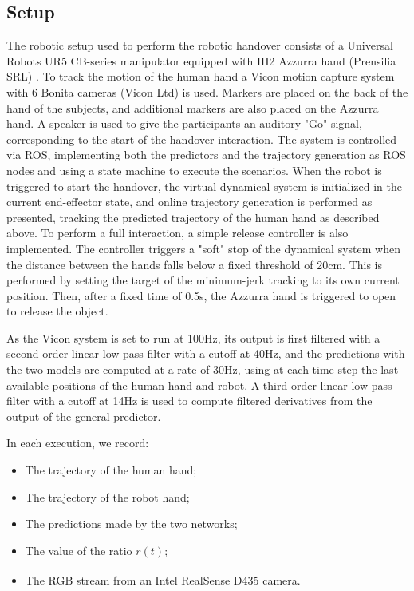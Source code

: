 \documentclass[lettersize,journal]{IEEEtran}
\begin{document}

\subsection{Setup}

\noindent
The robotic setup used to perform the robotic handover consists of a Universal Robots UR5 CB-series manipulator equipped with IH2 Azzurra hand (Prensilia SRL) \cite{cipriani_smarthand_2011}.
To track the motion of the human hand a Vicon motion capture system with 6 Bonita cameras (Vicon Ltd) is used.
Markers are placed on the back of the hand of the subjects, and additional markers are also placed on the Azzurra hand.
A speaker is used to give the participants an auditory "Go" signal, corresponding to the start of the handover interaction.
The system is controlled via ROS, implementing both the predictors and the trajectory generation as ROS nodes and using a state machine to execute the scenarios.
When the robot is triggered to start the handover, the virtual dynamical system is initialized in the current end-effector state, and online trajectory generation is performed as presented, tracking the predicted trajectory of the human hand as described above.
To perform a full interaction, a simple release controller is also implemented.
The controller triggers a "soft" stop of the dynamical system when the distance between the hands falls below a fixed threshold of 20cm.
This is performed by setting the target of the minimum-jerk tracking to its own current position.
Then, after a fixed time of 0.5s, the Azzurra hand is triggered to open to release the object.

As the Vicon system is set to run at 100Hz, its output is first filtered with a second-order linear low pass filter with a cutoff at 40Hz, and the predictions with the two models are computed at a rate of 30Hz, using at each time step the last available positions of the human hand and robot.
A third-order linear low pass filter with a cutoff at 14Hz is used to compute filtered derivatives from the output of the general predictor.

In each execution, we record:
\begin{itemize}
    \item The trajectory of the human hand;
    \item The trajectory of the robot hand;
    \item The predictions made by the two networks;
    \item The value of the ratio $r(t)$;
    \item The RGB stream from an Intel\textsuperscript{\textregistered} RealSense\textsuperscript{\textregistered} D435 camera.
\end{itemize}
\end{document}
